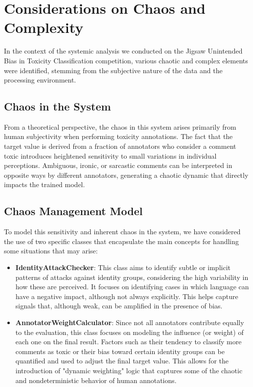 \documentclass[conference]{IEEEtran}
\begin{document}
\section{Considerations on Chaos and Complexity}
In the context of the systemic analysis we conducted on the Jigsaw Unintended Bias in Toxicity Classification competition, various chaotic and complex elements were identified, stemming from the subjective nature of the data and the processing environment.
\subsection{Chaos in the System}
From a theoretical perspective, the chaos in this system arises primarily from human subjectivity when performing toxicity annotations. The fact that the target value is derived from a fraction of annotators who consider a comment toxic introduces heightened sensitivity to small variations in individual perceptions. Ambiguous, ironic, or sarcastic comments can be interpreted in opposite ways by different annotators, generating a chaotic dynamic that directly impacts the trained model. 
\subsection{Chaos Management Model}
To model this sensitivity and inherent chaos in the system, we have considered the use of two specific classes that encapsulate the main concepts for handling some situations that may arise:
\begin{itemize}
\item \textbf{IdentityAttackChecker}: This class aims to identify subtle or implicit patterns of attacks against identity groups, considering the high variability in how these are perceived. It focuses on identifying cases in which language can have a negative impact, although not always explicitly. This helps capture signals that, although weak, can be amplified in the presence of bias.
\item \textbf{AnnotatorWeightCalculator}: Since not all annotators contribute equally to the evaluation, this class focuses on modeling the influence (or weight) of each one on the final result. Factors such as their tendency to classify more comments as toxic or their bias toward certain identity groups can be quantified and used to adjust the final target value. This allows for the introduction of "dynamic weighting" logic that captures some of the chaotic and nondeterministic behavior of human annotations.
\end{itemize}
\end{document}
